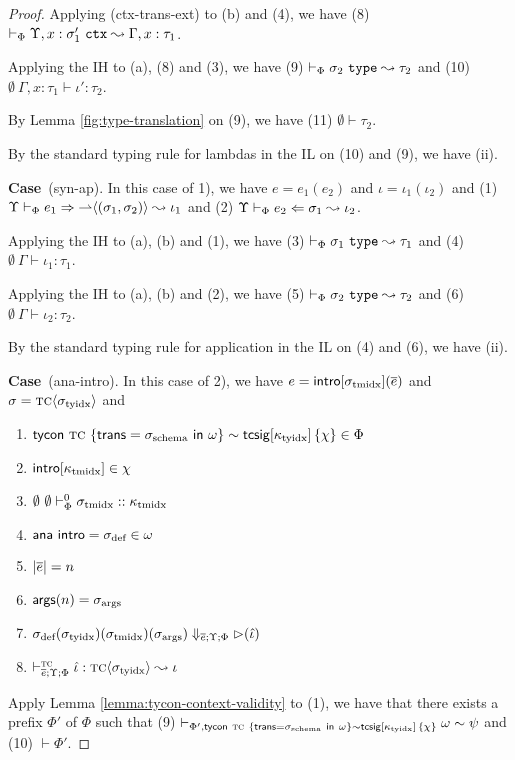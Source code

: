 \documentclass[12pt]{article}
\newcommand{\pfcase}[1]{\textbf{Case}~#1. }
\begin{document}
\begin{proof}
Applying (ctx-trans-ext) to (b) and (4), we have (8) $\vdash_{\Phi} \Upsilon, x : \sigma_1'~\mathtt{ctx} \leadsto \Gamma, x : \tau_1$.

Applying the IH to (a), (8) and (3), we have (9) $\vdash_{\Phi} \sigma_2~\mathtt{type} \leadsto \tau_2$ and (10) $\emptyset~\Gamma, x : \tau_1 \vdash \iota' : \tau_2$.

By Lemma \ref{fig:type-translation} on (9), we have (11) $\emptyset \vdash \tau_2$.

By the standard typing rule for lambdas in the IL on (10) and (9), we have (ii).


\pfcase{(syn-ap)} In this case of 1), we have $e=e_1(e_2)$ and $\iota=\iota_1(\iota_2)$ and (1) $\Upsilon \vdash_{\Phi} e_1 \Rightarrow {\rightharpoonup}\langle(\sigma_1, \sigma_2)\rangle \leadsto \iota_1$ and (2) $\Upsilon \vdash_{\Phi} e_2 \Leftarrow \sigma_1 \leadsto \iota_2$.

Applying the IH to (a), (b) and (1), we have (3) $\vdash_{\Phi} \sigma_1~\mathtt{type} \leadsto \tau_1$ and (4) $\emptyset~\Gamma \vdash \iota_1 : \tau_1$.

Applying the IH to (a), (b) and (2), we have (5) $\vdash_{\Phi} \sigma_2~\mathtt{type} \leadsto \tau_2$ and (6) $\emptyset~\Gamma \vdash \iota_2 : \tau_2$.

By the standard typing rule for application in the IL on (4) and (6), we have (ii).

\pfcase{(ana-intro)} In this case of 2), we have $e={\sf intro}[\sigma_\text{tmidx}](\overline{e})$ and $\sigma={\textsc{tc}}\langle\sigma_\text{tyidx}\rangle$ and \begin{enumerate}[(1)]
  \item ${\sf tycon}~\textsc{tc} ~\{{\sf trans}=\sigma_\text{schema}~{\sf in}~\omega\} \sim {\sf tcsig}[\kappa_\text{tyidx}]\,\{\chi\} \in \Phi$
  \item ${\sf intro}[\kappa_\text{tmidx}] \in \chi$
  \item $\emptyset~\emptyset \vdash_{\Phi}^{0} \sigma_\text{tmidx} :: \kappa_\text{tmidx}$
  \item ${\sf ana~intro}={\sigma_\text{def}} \in \omega$
  \item $|\overline{e}| = n$
  \item ${\sf args}(n)=\sigma_\text{args}$
  \item $\sigma_\text{def}(\sigma_\text{tyidx})(\sigma_\text{tmidx})(\sigma_\text{args}) \Downarrow_{\overline{e};\Upsilon;\Phi} {\rhd}(\hat{\iota})$
  \item $\vdash_{\overline{e};\Upsilon;\Phi}^{\textsc{tc}} \hat{\iota} : {{\textsc{tc}}\langle\sigma_\text{tyidx}\rangle} \leadsto \iota$
\end{enumerate}

Apply Lemma \ref{lemma:tycon-context-validity} to (1), we have that there exists a prefix $\Phi'$ of $\Phi$ such that (9) $\vdash_{\Phi', {\sf tycon}~\textsc{tc} ~\{{\sf trans}=\sigma_\text{schema}~{\sf in}~\omega\} \sim {\sf tcsig}[\kappa_\text{tyidx}]\,\{\chi\}} \omega \sim \psi$ and (10) $\vdash \Phi'$.


\end{proof}
\end{document}
